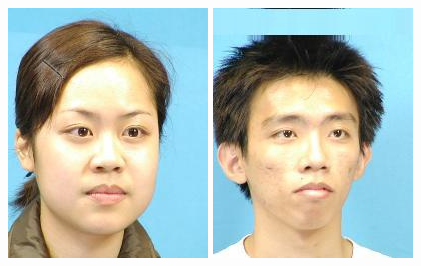 \documentclass[10pt,twocolumn,letterpaper]{article}
\begin{document}
\begin{figure}[htbp]
{\begin{minipage}[b]{0.22\linewidth}
\includegraphics[width=0.99\linewidth]{img/light&pose_invariance/p1.jpg}
\includegraphics[width=0.99\linewidth]{img/light&pose_invariance/p2.jpg}

\end{minipage}}
\end{figure}
\end{document}
